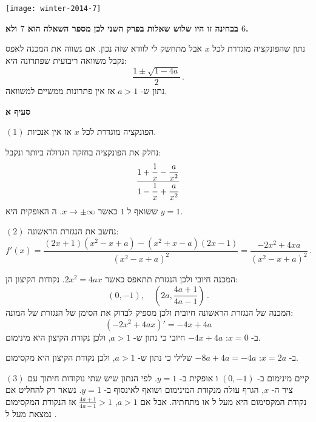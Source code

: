 \begin{center}
\texttt{[image: winter-2014-7]}
\end{center}

\vspace{-2ex}

\textbf{בבחינה זו היו שלוש שאלות בפרק השני לכן מספר השאלה הוא 
$7$
ולא 
$6$.}

נתון שהפונקציה מוגדרת לכל 
$x$
אבל מתחשק לי לוודא שזה נכון. אם נשווה את המכנה לאפס נקבל משוואה ריבועית שפתרונה היא:
\[
\frac{1\pm\sqrt{1-4a}}{2}\,.
\]
נתון ש-%
$a>1$
אז אין פתרונות ממשיים למשוואה.

\textbf{סעיף א}

$(1)$
הפונקציה מוגדרת לכל 
$x$
אז אין 
\asms{}
אנכיות.

נחלק את הפונקציה בחזקה הגדולה ביותר ונקבל:
\[
\displaystyle\frac{1+\displaystyle\frac{1}{x}-\displaystyle\frac{a}{x^2}}{1-\displaystyle\frac{1}{x}+\displaystyle\frac{a}{x^2}}
\]
ששואף ל
$1$
כאשר 
$x\rightarrow \pm\infty$.
ה%
\asm{}
האופקית היא
$y=1$.


$(2)$
נחשב את הנגזרת הראשונה:
\[
f'(x) =\frac{(2x+1)(x^2-x+a)-(x^2+x-a)(2x-1)}{(x^2-x+a)^2}=\frac{-2x^2+4xa}{(x^2-x+a)^2}\,.
\]

\np

המכנה חיובי ולכן הנגזרת תתאפס כאשר
$2x^2=4ax$.
נקודות הקיצון הן:
\[
(0,-1),\quad \left(2a,\frac{4a+1}{4a-1}\right)\,.
\]
המכנה של הנגזרת הראשונה חיובית ולכן מספיק לבדוק  את הסימן של הנגזרת של המונה:
\[
(-2x^2+4ax)'=-4x+4a
\]
ב-%
$x=0$:
$-4x+4a$
חיובי כי נתון ש-%
$a>1$,
ולכן נקודת הקיצון היא מינימום.

ב-%
$x=2a$:
$-8a+4a=-4a$
שלילי כי נתון ש-%
$a>1$,
ולכן נקודת הקיצון היא מקסימום.



$(3)$
קיים מינימום ב-%
$(0,-1)$
ו%
\asm{}
אופקית ב-%
$y=1$.
לפי הנתון שיש שתי נוקודות חיתוך עם ציר ה-%
$x$,
הגרף עולה מנקודת המינימום ושואף לאינסוף ב-%
$y=1$.
נשאר רק להחליט אם נקודת המקסימום היא מעל ל%
\asm{}
או מתחתיה. אבל אם
$a>1$,
$\frac{4a+1}{4a-1}>1$
אז הנקודת המקסימום נמצאת מעל ל%
\asm{}.
\begin{center}
\end{center}


